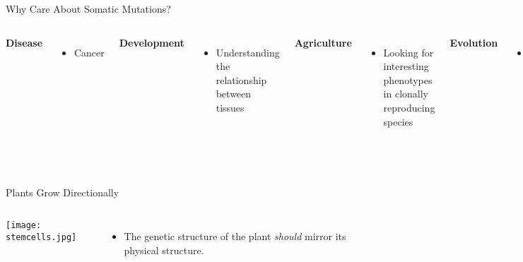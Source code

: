\documentclass{beamer}
\begin{document}
\begin{frame}{Why Care About Somatic Mutations?}
\begin{columns}

\textbf{Disease}
\begin{itemize}
\item Cancer
\end{itemize}

\vfill

\textbf{Development}
\begin{itemize}
\item Understanding the relationship between tissues
\end{itemize}

\vfill

\textbf{Agriculture}
\begin{itemize}
\item Looking for interesting phenotypes in clonally reproducing species
\end{itemize}

\textbf{Evolution}
\begin{itemize}
\item Determining the relationship between somatic and germline mutation rate
\end{itemize}

\texttt{[image: nectarine.jpg]}

\end{columns}
\end{frame}


\begin{frame}{Plants Grow Directionally}
\begin{columns}
		\texttt{[image: stemcells.jpg]}
		\begin{itemize}
			\item The genetic structure of the plant \textit{should} mirror its physical structure.
		\end{itemize}
\end{columns}
\end{frame}
\end{document}
